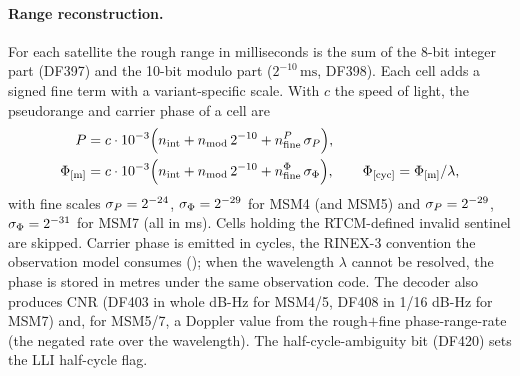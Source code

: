 \documentclass[main.tex]{subfiles}
\begin{document}
\paragraph{Range reconstruction.}
For each satellite the rough range in milliseconds is the sum of the
8-bit integer part (DF397) and the 10-bit modulo part
($2^{-10}\,\text{ms}$, DF398).  Each cell adds a signed fine term with a
variant-specific scale.  With $c$ the speed of light, the pseudorange and
carrier phase of a cell are
\begin{align}
P &= c\cdot 10^{-3}\Big(
  n_{\text{int}} + n_{\text{mod}}\,2^{-10}
  + n_{\text{fine}}^{P}\,\sigma_{P}\Big),
\label{eq:rt-msm-code}\\
\Phi_{[\text{m}]} &= c\cdot 10^{-3}\Big(
  n_{\text{int}} + n_{\text{mod}}\,2^{-10}
  + n_{\text{fine}}^{\Phi}\,\sigma_{\Phi}\Big),
\qquad
\Phi_{[\text{cyc}]} = \Phi_{[\text{m}]} / \lambda,
\label{eq:rt-msm-phase}
\end{align}
with fine scales $\sigma_{P}=2^{-24}$, $\sigma_{\Phi}=2^{-29}$
for MSM4 (and MSM5) and $\sigma_{P}=2^{-29}$, $\sigma_{\Phi}=2^{-31}$ for
MSM7 (all in ms).  Cells holding the RTCM-defined invalid sentinel are
skipped.  Carrier phase is emitted in cycles, the RINEX-3 convention the
observation model consumes (); when the wavelength $\lambda$ cannot be resolved, the phase
is stored in metres under the same observation code.  The decoder also
produces CNR (DF403 in whole dB-Hz for MSM4/5, DF408 in 1/16 dB-Hz for
MSM7) and, for MSM5/7, a Doppler value from the rough$+$fine
phase-range-rate (the negated rate over the wavelength).  The
half-cycle-ambiguity bit
(DF420) sets the LLI half-cycle flag.
\end{document}
